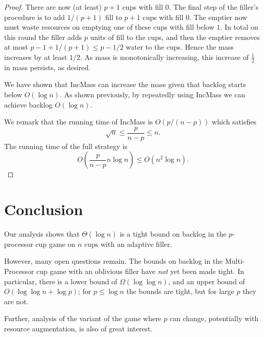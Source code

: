 \documentclass[twocolumn, 10pt]{article}
\begin{document}
\begin{proof}
There are now (at least) $p+1$ cups with fill $0$. The final step
of the filler's procedure is to add $1/(p+1)$ fill to $p+1$ cups with
fill $0$. 
The emptier now must waste resources on emptying one of these
cups with fill below $1$. In total on this round the filler adds
$p$ units of fill to the cups, and then the emptier removes at
most $p-1 + 1/(p+1) \le p-1/2$ water to the cups. Hence the mass
increases by at least $1/2$. As mass is monotonically increasing,
this increase of $\frac{1}{2}$ in mass persists, as desired.

We have shown that IncMass can increase the mass given that
backlog starts below $O(\log n)$. As shown previously, by
repeatedly using IncMass we can achieve backlog $O(\log n)$.

We remark that the running time of IncMass is $O(p/(n-p))$ 
which satisfies
$$\sqrt{n} \le \frac{p}{n-p} \le n.$$
The running time of the full strategy is 
$$O\left(\frac{p}{n-p} n\log n\right) \le O(n^2 \log n).$$
\end{proof}

\section{Conclusion}
Our analysis shows that $\Theta(\log n)$ is a tight bound on
backlog in the $p$-processor cup game on $n$ cups with an
adaptive filler.

However, many open questions remain. The bounds on backlog in the
Multi-Processor cup game with an oblivious filler have \emph{not}
yet been made tight. In particular, there is a lower bound of
$\Omega(\log \log n)$, and an upper bound of $O(\log \log n +
\log p)$; for $p \le \log n$ the bounds are tight, but for large
$p$ they are not.

Further, analysis of the variant of the game where $p$ can
change, potentially with resource augmentation, is also of great
interest.
\end{document}
